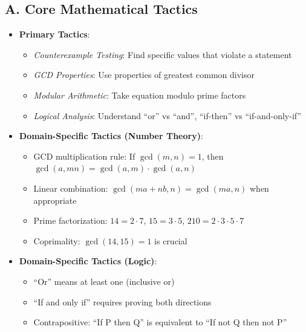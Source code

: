 \documentclass[12pt]{article}
\begin{document}
\begin{tacticalbox}
\subsection*{A. Core Mathematical Tactics}
\begin{itemize}[leftmargin=*]
    \item \textbf{Primary Tactics}: 
    \begin{itemize}
        \item \emph{Counterexample Testing}: Find specific values that violate a statement
        \item \emph{GCD Properties}: Use properties of greatest common divisor
        \item \emph{Modular Arithmetic}: Take equation modulo prime factors
        \item \emph{Logical Analysis}: Understand ``or'' vs ``and'', ``if-then'' vs ``if-and-only-if''
    \end{itemize}
    \item \textbf{Domain-Specific Tactics (Number Theory)}: 
    \begin{itemize}
        \item GCD multiplication rule: If $\gcd(m,n)=1$, then $\gcd(a, mn) = \gcd(a,m) \cdot \gcd(a,n)$
        \item Linear combination: $\gcd(ma+nb, n) = \gcd(ma, n)$ when appropriate
        \item Prime factorization: $14 = 2 \cdot 7$, $15 = 3 \cdot 5$, $210 = 2 \cdot 3 \cdot 5 \cdot 7$
        \item Coprimality: $\gcd(14,15) = 1$ is crucial
    \end{itemize}
    \item \textbf{Domain-Specific Tactics (Logic)}: 
    \begin{itemize}
        \item ``Or'' means at least one (inclusive or)
        \item ``If and only if'' requires proving both directions
        \item Contrapositive: ``If P then Q'' is equivalent to ``If not Q then not P''
    \end{itemize}
\end{itemize}
\end{tacticalbox}
\end{document}
